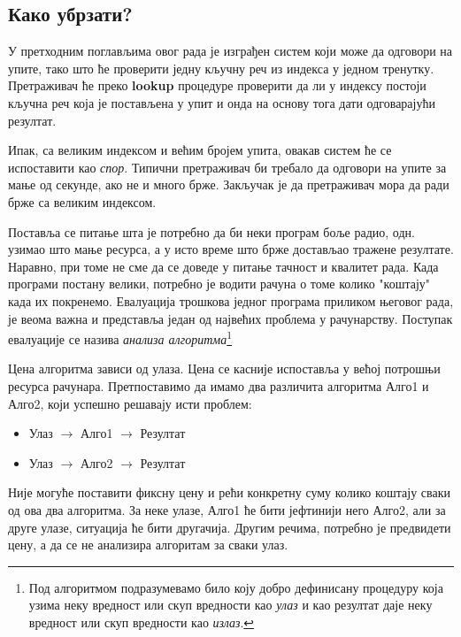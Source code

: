 \subsection{Како убрзати?}

У претходним поглављима овог рада је изграђен систем који може да одговори на упите, тако што ће проверити једну кључну реч из индекса у једном тренутку. Претраживач ће преко \textbf{lookup} процедуре проверити да ли у индексу постоји кључна реч која је постављена у упит и онда на основу тога дати одговарајући резултат.

Ипак, са великим индексом и већим бројем упита, овакав систем ће се испоставити као \emph{спор}. Типични претраживач би требало да одговори на упите за мање од секунде, ако не и много брже. Закључак је да претраживач мора да ради брже са великим индексом.

Поставља се питање шта је потребно да би неки програм боље радио, одн. узимао што мање ресурса, а у исто време што брже достављао тражене резултате. Наравно, при томе не сме да се доведе у питање тачност и квалитет рада. Када програми постану велики, потребно је водити рачуна о томе колико "коштају" када их покренемо. Евалуација трошкова једног програма приликом његовог рада, је веома важна и представља један од највећих проблема у рачунарству. Поступак евалуације се назива \emph{анализа алгоритма}\footnote{Под алгоритмом подразумевамо било коју добро дефинисану процедуру која узима неку вредност или скуп вредности као \emph{улаз} и као резултат даје неку вредност или скуп вредности као \emph{излаз}.\cite{cormen2001introduction}}

Цена алгоритма зависи од улаза. Цена се касније испоставља у већој потрошњи ресурса рачунара. Претпоставимо да имамо два различита алгоритма Алго1 и Алго2, који успешно решавају исти проблем:

\begin{itemize}
\item Улаз $\longrightarrow$ Алго1 $\longrightarrow$ Резултат
\item Улаз $\longrightarrow$ Алго2 $\longrightarrow$ Резултат
\end{itemize}

Није могуће поставити фиксну цену и рећи конкретну суму колико коштају сваки од ова два алгоритма. За неке улазе, Алго1 ће бити јефтинији него Алго2, али за друге улазе, ситуација ће бити другачија. Другим речима, потребно је предвидети цену, а да се не анализира алгоритам за сваки улаз.

